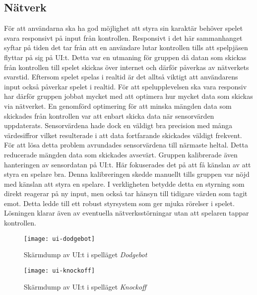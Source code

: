 \subsection{Nätverk}
För att användarna ska ha god möjlighet att styra sin karaktär behöver spelet svara responsivt på input från kontrollen. Responsivt i det här sammanhanget syftar på tiden det tar från att en användare lutar kontrollen tills att spelpjäsen flyttar på sig på UI:t. Detta var en utmaning för gruppen då datan som skickas från kontrollen till spelet skickas över internet och därför påverkas av nätverkets svarstid. Eftersom spelet spelas i realtid är det alltså viktigt att användarens input också påverkar spelet i realtid. För att spelupplevelsen ska vara responsiv har därför gruppen jobbat mycket med att optimera hur mycket data som skickas via nätverket. En genomförd optimering för att minska mängden data som skickades från kontrollen var att enbart skicka data när sensorvärden uppdaterats. Sensorvärdena hade dock en väldigt bra precision med många värdesiffror vilket resulterade i att data fortfarande skickades väldigt frekvent. För att lösa detta problem avrundades sensorvärdena till närmaste heltal. Detta reducerade mängden data som skickades avsevärt. Gruppen kalibrerade även hanteringen av sensordatan på UI:t. Här fokuserades det på att få känslan av att styra en spelare bra. Denna kalibreringen skedde manuellt tills gruppen var nöjd med känslan att styra en spelare. I verkligheten betydde detta en styrning som direkt reagerar på ny input, men också tar hänsyn till tidigare värden som tagit emot. Detta ledde till ett robust styrsystem som ger mjuka rörelser i spelet. Lösningen klarar även av eventuella nätverksstörningar utan att spelaren tappar kontrollen.

\begin{figure}[t]
    \centering
    \texttt{[image: ui-dodgebot]}
    \caption{Skärmdump av UI:t i spelläget \textit{Dodgebot}}
    \label{fig:ui-dodgebot}
\end{figure}

\begin{figure}[b]
    \centering
    \texttt{[image: ui-knockoff]}
    \caption{Skärmdump av UI:t i spelläget \textit{Knockoff}}
    \label{fig:ui-knockoff}
\end{figure}
